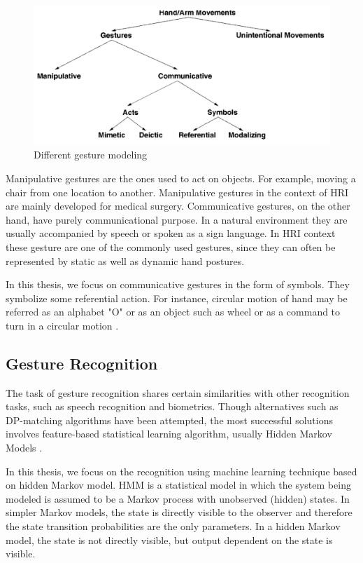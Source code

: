 \begin{figure}
	[h] \centering 
	\includegraphics[width=13cm]{figures/ges-tax.png} 
	\caption{Different gesture modeling} 
	\label{fig:ges:tax} 
\end{figure}

Manipulative gestures are the ones used to act on objects. For example, moving a chair from one location to another. Manipulative gestures in the context of HRI are mainly developed for medical surgery. Communicative gestures, on the other hand, have purely communicational purpose. In a natural environment they are usually accompanied by speech or spoken as a sign language. In HRI context these gesture are one of the commonly used gestures, since they can often be represented by static as well as dynamic hand postures.

In this thesis, we focus on communicative gestures in the form of symbols. They symbolize some referential action. For instance, circular motion of hand may be referred as an alphabet "O" or as an object such as wheel or as a command to turn in a circular motion .


\subsection{Gesture Recognition}
The task of gesture recognition shares certain similarities with other recognition tasks, such as speech recognition and biometrics. Though alternatives such as DP-matching algorithms have been attempted, the most successful solutions involves feature-based statistical learning algorithm, usually Hidden Markov Models \cite{5}. 

In this thesis, we focus on the recognition using  machine learning technique based on hidden Markov model. HMM is a statistical model in which the system being modeled is assumed to be a Markov process with unobserved (hidden) states. In simpler Markov models, the state is directly visible to the observer and therefore the state transition probabilities are the only parameters. In a hidden Markov model, the state is not directly visible, but output dependent on the state is visible.


